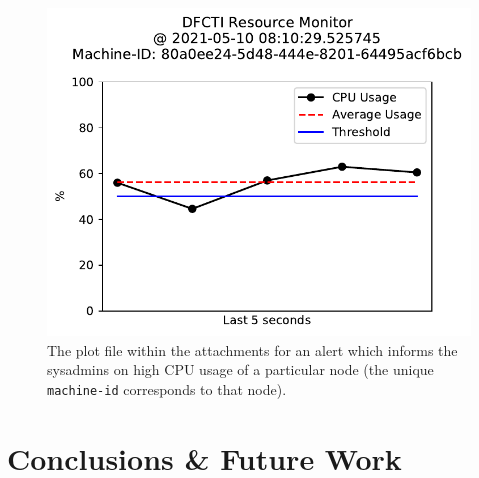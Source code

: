 \documentclass[conference]{IEEEtran}
\begin{document}
\begin{figure}[htbp]
    \centering
    \includegraphics[scale=0.6]{figs/cpu_usage.pdf}
    \caption{The plot file within the attachments for an alert which informs the sysadmins on high CPU usage of a particular node (the unique \texttt{machine-id} corresponds to that node).}
    \label{cpu-ss}
\end{figure}

\section{Conclusions \& Future Work}
\label{section-conclusions}
\end{document}
